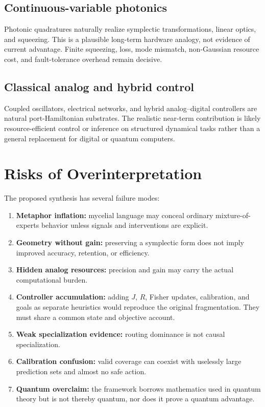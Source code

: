 \documentclass[11pt]{article}
\theoremstyle{definition}\newtheorem{definition}{Definition}\newtheorem{assumption}{Assumption}
\theoremstyle{remark}\newtheorem{remark}{Remark}
\begin{document}
\subsection{Continuous-variable photonics}
Photonic quadratures naturally realize symplectic transformations, linear optics, and squeezing. This is a plausible long-term hardware analogy, not evidence of current advantage. Finite squeezing, loss, mode mismatch, non-Gaussian resource cost, and fault-tolerance overhead remain decisive.

\subsection{Classical analog and hybrid control}
Coupled oscillators, electrical networks, and hybrid analog--digital controllers are natural port-Hamiltonian substrates. The realistic near-term contribution is likely resource-efficient control or inference on structured dynamical tasks rather than a general replacement for digital or quantum computers.

\section{Risks of Overinterpretation}
The proposed synthesis has several failure modes:
\begin{enumerate}[leftmargin=*]
\item \textbf{Metaphor inflation:} mycelial language may conceal ordinary mixture-of-experts behavior unless signals and interventions are explicit.
\item \textbf{Geometry without gain:} preserving a symplectic form does not imply improved accuracy, retention, or efficiency.
\item \textbf{Hidden analog resources:} precision and gain may carry the actual computational burden.
\item \textbf{Controller accumulation:} adding $J$, $R$, Fisher updates, calibration, and goals as separate heuristics would reproduce the original fragmentation. They must share a common state and objective account.
\item \textbf{Weak specialization evidence:} routing dominance is not causal specialization.
\item \textbf{Calibration confusion:} valid coverage can coexist with uselessly large prediction sets and almost no safe action.
\item \textbf{Quantum overclaim:} the framework borrows mathematics used in quantum theory but is not thereby quantum, nor does it prove a quantum advantage.
\end{enumerate}
\end{document}
